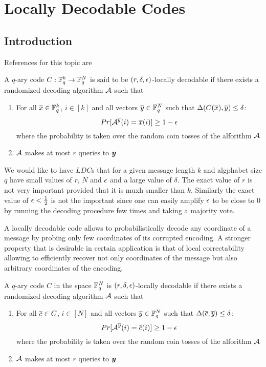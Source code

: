 \chapter{Locally Decodable Codes}
\section{Introduction}
References for this topic are \cite{ldcsergeysurvey}
\begin{definition}
	A $q$-ary code $C:\mathbb{F}^k_q\to \mathbb{F}_q^N$ is said to be $(r,\delta, \epsilon)$-locally decodable if there exists a randomized decoding algorithm $\mathcal{A}$ such that \begin{enumerate}
		\item For all $\overline{x}\in \mathbb{F}_q^k$, $i\in [k]$ and all vectors $\overline{y}\in \mathbb{F}_q^N$ such that $\Delta(C(\overline{x}),\overline{y})\leq \delta$: $$Pr[\mathcal{A}^{\overline{y}}(i)=\overline{x}(i)]\geq 1-\epsilon$$where the probability is taken over the random coin tosses of the alforithm $\mathcal{A}$
		\item $\mathcal{A}$ makes at most $r$ queries to $\boldsymbol{y}$
	\end{enumerate}
\end{definition}

We would like to have $LDC$s that for a given message length $k$ and algphabet size $q$ have small values of $r$, $N$ and $\epsilon$ and a large value of $\delta$. The exact value of $r$ is not very important provided that it is muxh smaller than $k$. Similarly the exact value of $\epsilon<\frac12$ is not the important since one can easily amplify $\epsilon$ to be close to 0 by running the decoding procedure few times and taking a majority vote. 

A locally decodable code allows to probabilistically decode any coordinate of a message by probing only few coordinates of its corrupted encoding. A stronger property that is desirable in certain application is that of local correctability allowing to efficiently recover not only coordinates of the message but also arbitrary coordinates of the encoding. 

\begin{definition}
	A $q$-ary code $C$ in the space $ \mathbb{F}_q^N$ is  $(r,\delta, \epsilon)$-locally decodable if there exists a randomized decoding algorithm $\mathcal{A}$ such that \begin{enumerate}
	\item For all $\overline{c}\in C$, $i\in [N]$ and all vectors $\overline{y}\in \mathbb{F}_q^N$ such that $\Delta(\overline{c},\overline{y})\leq \delta$: $$Pr[\mathcal{A}^{\overline{y}}(i)=\overline{c}(i)]\geq 1-\epsilon$$where the probability is taken over the random coin tosses of the alforithm $\mathcal{A}$
	\item $\mathcal{A}$ makes at most $r$ queries to $\boldsymbol{y}$
\end{enumerate}
\end{definition}

